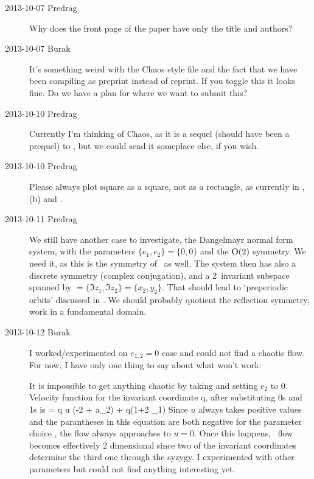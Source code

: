 \begin{description}
\item[2013-10-07 Predrag]
Why does the front page of the paper have only the title and authors?
\item[2013-10-07 Burak]
{It's something weird with the Chaos style file and the fact that
    we have been compiling as preprint instead of reprint. If you toggle
    this it looks fine. Do we have a plan for where we want to submit
    this?}
\item[2013-10-10 Predrag]
Currently I'm thinking of Chaos, as it is a sequel (should have been
a prequel) to , but we could send it someplace else,
if you wish.

\item[2013-10-10 Predrag]
Please always plot square as a square, not as a rectangle,
as currently in
, \,(b) and
.

\item[2013-10-11 Predrag]
We still have another case to investigate, the Dangelmayr
normal form system, with the parameters $\{e_1,e_2\}=\{0,0\}$
and the $\textrm{O}(2)$ symmetry. We need it, as this is the symmetry of \KS\
as well. The system  then has also a discrete symmetry
(complex conjugation), and a 2\dmn\ invariant subspace spanned by
$=\{\Im{z}_1,\Im{z}_2\}=\{x_2,y_2\}$.
That should lead to `preperiodic orbits' discussed in .
We should probably quotient the reflection symmetry, work in a
fundamental domain.

\item[2013-10-12 Burak]
I worked/experimented on $e_{1,2} = 0$ case and could not find a chaotic
flow. For now, I have only one thing to say about what won't work:

It is impossible to get anything chaotic by taking 
and setting $e_2$ to 0. Velocity function for the invariant coordinate q,
after substituting 0s and 1s \refeq{eq:1sand0s} is
\beq
	 = q u (-2 + a_2) + q(1+2 \mu_1)
	\label{vq1sand0s}
\eeq
Since $u$ always takes positive values and the parantheses in this equation
are both negative for the parameter choice \refeq{eq:parsc2red}, the flow
always approaches to $u=0$. Once this happens, \twoMode\ flow becomes effectively
2 dimensional since two of the invariant coordinates determine the third one
through the syzygy. I experimented with other parameters but could not find
anything interesting yet.


\end{description}
